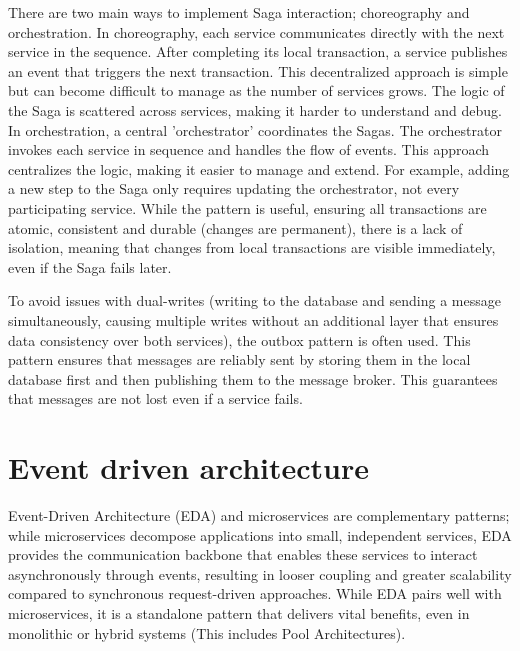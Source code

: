 \documentclass[]{final}
\begin{document}
There are two main ways to implement Saga interaction; choreography and
orchestration. In choreography, each service communicates directly with the
next service in the sequence. After completing its local transaction, a
service publishes an event that triggers the next transaction. This
decentralized approach is simple but can become difficult to manage as the
number of services grows. The logic of the Saga is scattered across
services, making it harder to understand and debug. %
In orchestration, a central 'orchestrator' coordinates the Sagas. The orchestrator
invokes each service in sequence and handles the flow of events. This approach
centralizes the logic, making it easier to manage and extend. For example,
adding a new step to the Saga only requires updating the orchestrator,
not every participating service. %
While the pattern is useful, ensuring all transactions are atomic, consistent and
durable (changes are permanent), there is a lack of isolation, meaning that
changes from local transactions are visible immediately, even if the Saga fails
later.

To avoid issues with dual-writes (writing to the database and sending a message
simultaneously, causing multiple writes without an additional layer that
ensures data consistency over both services), the outbox pattern is often used.
This pattern ensures that messages are reliably sent by storing them in the
local database first and then publishing them to the message broker. This
guarantees that messages are not lost even if a service fails.

\section{Event driven architecture}

Event-Driven Architecture (EDA) and microservices are complementary patterns;
while microservices decompose applications into small, independent services,
EDA provides the communication backbone that enables these services to
interact asynchronously through events, resulting in looser coupling and
greater scalability compared to synchronous request-driven approaches.
While EDA pairs well with microservices, it is a standalone
pattern that delivers vital benefits, even in monolithic or hybrid systems
(This includes Pool Architectures).
\end{document}
